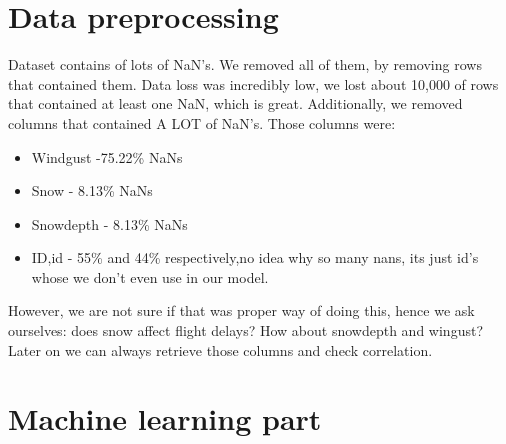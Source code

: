 \documentclass{article}
\begin{document}
\section{Data preprocessing}
Dataset contains of lots of NaN's. We removed all of them, by removing rows that contained them. Data loss
was incredibly low, we lost about 10,000 of rows that contained at least one NaN, which is great. Additionally,
we removed columns that contained A LOT of NaN's. Those columns were:
	\begin{itemize}
		\item Windgust -75.22\% NaNs
		\item Snow - 8.13\% NaNs
		\item Snowdepth - 8.13\% NaNs
		\item ID,id - 55\% and 44\% respectively,no idea why so many nans, its just id's whose we don't even use in our model.
	\end{itemize}


However, we are not sure if that was proper way of doing this, hence we ask ourselves: does snow affect flight delays? How about snowdepth and wingust? Later on we can always retrieve those columns and check correlation.

\section{Machine learning part}
\end{document}
